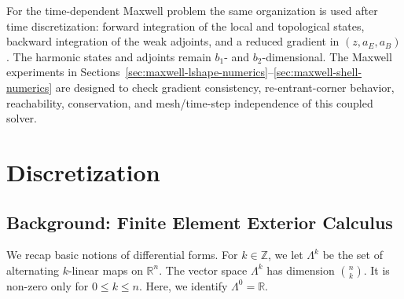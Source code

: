 \documentclass{article}
\begin{document}
For the time-dependent Maxwell problem the same organization is used after time discretization: forward integration of the local and topological states, backward integration of the weak adjoints, and a reduced gradient in $(z,a_E,a_B)$.  The harmonic states and adjoints remain $b_1$- and $b_2$-dimensional.  The Maxwell experiments in Sections~\ref{sec:maxwell-lshape-numerics}--\ref{sec:maxwell-shell-numerics} are designed to check gradient consistency, re-entrant-corner behavior, reachability, conservation, and mesh/time-step independence of this coupled solver.

\section{Discretization}\label{s:disc}

\subsection{Background: Finite Element Exterior Calculus}\label{s:feec}

We recap basic notions of differential forms.
For $k \in \mathbb Z$, we let $\Lambda^k$ be the set of alternating $k$-linear maps on $\mathbb R^n$.
The vector space $\Lambda^k$ has dimension $\binom{n}{k}$.
It is non-zero only for $0 \leq k \leq n$.
Here, we identify $\Lambda^0 = \mathbb R$.
\end{document}
